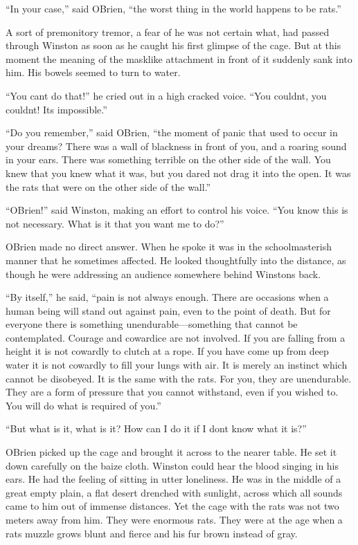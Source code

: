 ``In your case,'' said O\textquotesingle Brien, ``the worst thing in the
world happens to be rats.''

A sort of premonitory tremor, a fear of he was not certain what, had
passed through Winston as soon as he caught his first glimpse of the
cage. But at this moment the meaning of the masklike attachment in front
of it suddenly sank into him. His bowels seemed to turn to water.

``You can\textquotesingle t do that!'' he cried out in a high cracked
voice. ``You couldn\textquotesingle t, you couldn\textquotesingle t!
It\textquotesingle s impossible.''

``Do you remember,'' said O\textquotesingle Brien, ``the moment of panic
that used to occur in your dreams? There was a wall of blackness in
front of you, and a roaring sound in your ears. There was something
terrible on the other side of the wall. You knew that you knew what it
was, but you dared not drag it into the open. It was the rats that were
on the other side of the wall.''

``O\textquotesingle Brien!'' said Winston, making an effort to control his
voice. ``You know this is not necessary. What is it that you want me to
do?''

O\textquotesingle Brien made no direct answer. When he spoke it was in
the schoolmasterish manner that he sometimes affected. He looked
thoughtfully into the distance, as though he were addressing an audience
somewhere behind Winston\textquotesingle s back.

``By itself,'' he said, ``pain is not always enough. There are occasions
when a human being will stand out against pain, even to the point of
death. But for everyone there is something unendurable---something that
cannot be contemplated. Courage and cowardice are not involved. If you
are falling from a height it is not cowardly to clutch at a rope. If you
have come up from deep water it is not cowardly to fill your lungs with
air. It is merely an instinct which cannot be disobeyed. It is the same
with the rats. For you, they are unendurable. They are a form of
pressure that you cannot withstand, even if you wished to. You will do
what is required of you.''

``But what is it, what is it? How can I do it if I don\textquotesingle t
know what it is?''

O\textquotesingle Brien picked up the cage and brought it across to the
nearer table. He set it down carefully on the baize cloth. Winston could
hear the blood singing in his ears. He had the feeling of sitting in
utter loneliness. He was in the middle of a great empty plain, a flat
desert drenched with sunlight, across which all sounds came to him out
of immense distances. Yet the cage with the rats was not two meters away
from him. They were enormous rats. They were at the age when a
rat\textquotesingle s muzzle grows blunt and fierce and his fur brown
instead of gray.

